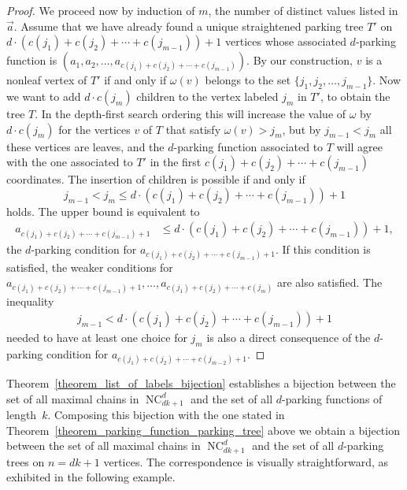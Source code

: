 \documentclass[11pt]{amsart}
\numberwithin{equation}{section}
\DeclareMathOperator{\NC}{NC}
\begin{document}
\begin{proof}
We proceed now by induction of $m$, the number of distinct values listed
in $\vec{a}$. Assume that we have already found a unique straightened
parking tree $T'$ on $d \cdot (c(j_{1})+c(j_{2})+\cdots+c(j_{m-1}))+1$ vertices whose
associated $d$-parking function is
$(a_{1},a_{2},\ldots,a_{c(j_{1})+c(j_{2})+\cdots+c(j_{m-1})})$. By our
construction, $v$ is a nonleaf vertex of $T'$ if and only if $\omega(v)$
belongs to the set $\{j_{1},j_{2},\ldots,j_{m-1}\}$.  Now we want to
add $d \cdot c(j_{m})$ children to the vertex labeled $j_{m}$ in $T'$, to obtain
the tree $T$. In the depth-first search ordering this will increase the
value of $\omega$ by $d \cdot c(j_{m})$ for the vertices $v$ of $T$ that satisfy
$\omega(v)>j_{m}$, but by $j_{m-1}<j_{m}$ all these vertices are leaves, and
the $d$-parking function associated to $T$ will agree with the one
associated to $T'$ in the first $c(j_{1})+c(j_{2})+\cdots+c(j_{m-1})$
  coordinates. The insertion of children is possible if and only if
\begin{equation}
\label{inequality_parking_m}  
j_{m-1} < j_{m} \leq d \cdot (c(j_{1})+c(j_{2})+\cdots+c(j_{m-1})) + 1
\end{equation}  
holds. The upper bound is equivalent to
\begin{align*}
a_{c(j_{1})+c(j_{2})+\cdots+c(j_{m-1})+1}
& \leq d \cdot (c(j_{1})+c(j_{2})+\cdots+c(j_{m-1})) + 1,
\end{align*}
the $d$-parking condition for
$a_{c(j_{1})+c(j_{2})+\cdots+c(j_{m-1})+1}$. If this condition is satisfied,
the weaker conditions for $a_{c(j_{1})+c(j_{2})+\cdots+c(j_{m-1})+1},
\ldots, a_{c(j_{1})+c(j_{2})+\cdots+c(j_{m})}$ are also satisfied. The
inequality
\begin{align*}
j_{m-1} < d \cdot (c(j_{1})+c(j_{2})+\cdots+c(j_{m-1})) + 1
\end{align*}
needed to have at least one choice for $j_{m}$ is also a direct
consequence of the $d$-parking condition for
$a_{c(j_{1})+c(j_{2})+\cdots+c(j_{m-2})+1}$.   
\end{proof}  

  
Theorem~\ref{theorem_list_of_labels_bijection}
establishes a bijection between the set of all maximal chains in
$\NC^{d}_{dk+1}$ and the set of all $d$-parking functions of length~$k$.
Composing this bijection with the one stated in
Theorem~\ref{theorem_parking_function_parking_tree} above we obtain a
bijection between the set of all maximal chains in
$\NC^{d}_{dk+1}$ and the set of all $d$-parking trees on $n=dk+1$
vertices. The correspondence is visually straightforward, as exhibited
in the following example.   
\end{document}
